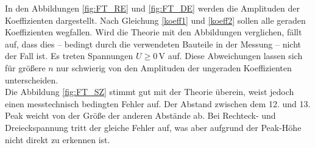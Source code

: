 In den Abbildungen \ref{fig:FT_RE} und \ref{fig:FT_DE} werden die Amplituden der Koeffizienten dargestellt. 
Nach Gleichung  \eqref{koeff1} und \eqref{koeff2} sollen alle geraden Koeffizienten wegfallen. 
Wird die Theorie mit den Abbildungen verglichen, fällt auf, dass dies -- bedingt durch die verwendeten Bauteile in der Messung -- nicht der Fall ist. 
Es treten Spannungen $U\geqslant0\,\si\volt$ auf.
Diese Abweichungen lassen sich für größere $n$ nur schwierig von den Amplituden der ungeraden Koeffizienten unterscheiden.\\
Die Abbildung \ref{fig:FT_SZ} stimmt gut mit der Theorie überein, weist jedoch einen messtechnisch bedingten Fehler auf. Der Abstand zwischen dem 12. und 13. Peak weicht von der Größe der anderen Abstände ab. Bei Rechteck- und Dreieckspannung tritt der gleiche Fehler auf, was aber aufgrund der Peak-Höhe nicht direkt zu erkennen ist.
\newpage
